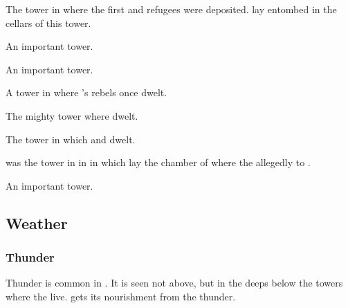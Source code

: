 \begin{gloss}



  \gitem{\Jazerubel}
  The tower in  where the first \resphan and \nephil refugees were deposited.
  \Semiza lay entombed in the cellars of this tower. 



  \gitem{\Lamaruch}
  An important \Mystraacht tower.



  \gitem{\Roshmal}
  An important \Mystraacht tower.



  \gitem{\Sherem}
  A tower in \Merkyrah where 's rebels once dwelt.



  \gitem{\Shaiphon}
  The mighty tower where  dwelt.



  \gitem{\Tebethal}
  The tower in which  and  dwelt. 



  \gitem{\Tirunad}
  \Tirunad was the tower in  in  in which lay the chamber of  where the  allegedly  to .



  \gitem{\Tzarubal}
  An important \Mystraacht tower.



\end{gloss}









\subsection{Weather}





\subsubsection{Thunder}
Thunder is common in \Nyx.
It is seen not above, but in the deeps below the towers where the \resphain live. 
 gets its nourishment from the thunder. 















